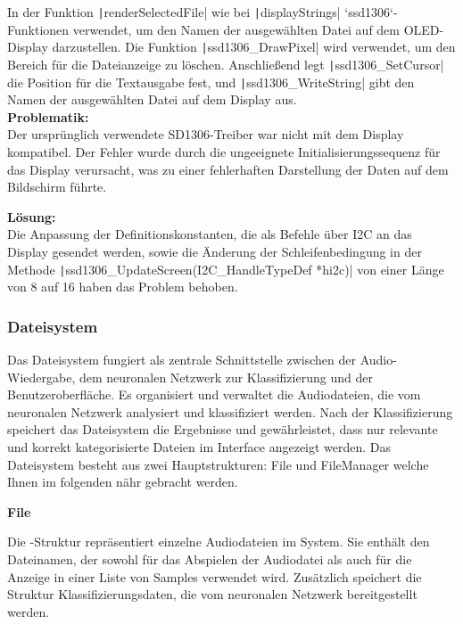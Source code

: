 In der Funktion \texttt|renderSelectedFile| wie bei \texttt|displayStrings| `ssd1306`-Funktionen verwendet, um den Namen der ausgewählten Datei auf dem OLED-Display darzustellen. Die Funktion \texttt|ssd1306_DrawPixel| wird verwendet, um den Bereich für die Dateianzeige zu löschen. Anschließend legt \texttt|ssd1306_SetCursor| die Position für die Textausgabe fest, und \texttt|ssd1306_WriteString| gibt den Namen der ausgewählten Datei auf dem Display aus. \\

\textbf{Problematik:} \\

Der ursprünglich verwendete SD1306-Treiber war nicht mit dem Display kompatibel. Der Fehler wurde durch die ungeeignete Initialisierungssequenz für das Display verursacht, was zu einer fehlerhaften Darstellung der Daten auf dem Bildschirm führte.

\textbf{Lösung:} \\

Die Anpassung der Definitionskonstanten, die als Befehle über I2C an das Display gesendet werden, sowie die Änderung der Schleifenbedingung in der Methode \texttt|ssd1306_UpdateScreen(I2C_HandleTypeDef *hi2c)| von einer Länge von 8 auf 16 haben das Problem behoben.
\newpage


\subsubsection{Dateisystem} 
\vspace{1em}
\hypertarget{Dateisystem}{}
Das Dateisystem fungiert als zentrale Schnittstelle zwischen der Audio-Wiedergabe, dem neuronalen Netzwerk zur Klassifizierung und der Benutzeroberfläche. Es organisiert und verwaltet die Audiodateien, die vom neuronalen Netzwerk analysiert und klassifiziert werden. Nach der Klassifizierung speichert das Dateisystem die Ergebnisse und gewährleistet, dass nur relevante und korrekt kategorisierte Dateien im Interface angezeigt werden. Das Dateisystem besteht aus zwei Hauptstrukturen: File und FileManager welche Ihnen im folgenden nähr gebracht werden.

\vspace{1em}
\textbf{File}
\vspace{1em}

Die -Struktur repräsentiert einzelne Audiodateien im System. Sie enthält den Dateinamen, der sowohl für das Abspielen der Audiodatei als auch für die Anzeige in einer Liste von Samples verwendet wird. Zusätzlich speichert die Struktur Klassifizierungsdaten, die vom neuronalen Netzwerk bereitgestellt werden.


